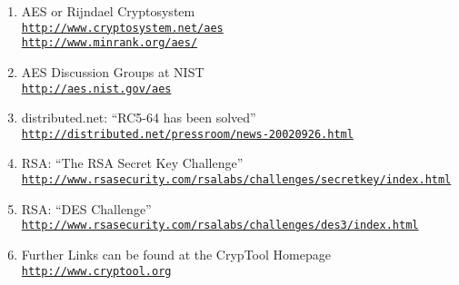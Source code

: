 \begin{enumerate}

\item AES or Rijndael Cryptosystem \\
        \href{http://www.cryptosystem.net/aes}
         {\tt http://www.cryptosystem.net/aes} \\
	\href{http://www.minrank.org/aes/}
         {\tt http://www.minrank.org/aes/}

  \item AES Discussion Groups at NIST \\
	\href{http://aes.nist.gov/aes}{\tt http://aes.nist.gov/aes}

  \item distributed.net: ``RC5-64 has been solved'' \\
        \href{http://distributed.net/pressroom/news-20020926.html}
         {\tt http://distributed.net/pressroom/news-20020926.html}

  \item RSA: ``The RSA Secret Key Challenge'' \\
      \href{http://www.rsasecurity.com/rsalabs/challenges/secretkey/index.html}
       {\tt http://www.rsasecurity.com/rsalabs/challenges/secretkey/index.html}

  \item RSA: ``DES Challenge'' \\
        \href{http://www.rsasecurity.com/rsalabs/challenges/des3/index.html}
         {\tt http://www.rsasecurity.com/rsalabs/challenges/des3/index.html}

  \item Further Links can be found at the CrypTool Homepage \\
        \href{http://www.cryptool.org}
         {\tt http://www.cryptool.org}
	       
\end{enumerate}



